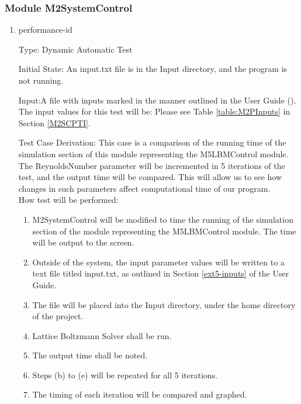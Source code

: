 \documentclass[12pt, titlepage]{article}
\newcommand{\myprogname}{Lattice Boltzmann Solver}
\newcounter{uvtestcounter} %
\begin{document}
\subsubsection{Module M2SystemControl}
		
\begin{enumerate}

\item{performance-id\theuvtestcounter\\}

Type: Dynamic Automatic Test

Initial State: An input.txt file is in the Input directory, and the program is not running.

Input:A file with inputs marked in the manner outlined in the
User Guide (\citet{LBM_UserGuide_PM}).\\The input values for this test will
be: Please see Table \ref{table:M2PInputs} in Section \ref{M2SCPTI}.

Test Case Derivation: This case is a comparison of the running time of the simulation section of this module representing the M5LBMControl module.  
The ReynoldsNumber parameter will be incremented in 5 iterations of the test, and the output time will be compared. This will allow us to see how changes in such parameters affect computational time of our program.\\

How test will be performed:
\begin{enumerate}
	\item M2SystemControl will be modified to time the running of the simulation section of the module representing the M5LBMControl module. The time will be output to the screen.
	\item Outside of the system, the input parameter values will be written to a text file titled input.txt, as outlined in Section \ref{ext5-inputs} of the User Guide.
	\item The file will be placed into the Input directory, under the home directory of the project.
	\item {\myprogname} shall be run. 
	\item The output time shall be noted.
	\item Steps (b) to (e) will be repeated for all 5 iterations.
	\item The timing of each iteration will be compared and graphed.
\end{enumerate}

\end{enumerate}
\end{document}
